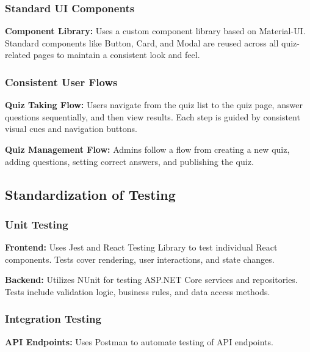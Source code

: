 \subsubsection{Standard UI Components}

  \item \textbf{Component Library:} Uses a custom component library based on Material-UI. Standard components like Button, Card, and Modal are reused across all quiz-related pages to maintain a consistent look and feel.

\subsubsection{Consistent User Flows}

\item \textbf{Quiz Taking Flow:} Users navigate from the quiz list to the quiz page, answer questions sequentially, and then view results. Each step is guided by consistent visual cues and navigation buttons.

\item \textbf{Quiz Management Flow:} Admins follow a flow from creating a new quiz, adding questions, setting correct answers, and publishing the quiz.

\subsection{Standardization of Testing}

\subsubsection{Unit Testing}

\item \textbf{Frontend:} Uses Jest and React Testing Library to test individual React components. Tests cover rendering, user interactions, and state changes.

\item \textbf{Backend:} Utilizes NUnit for testing ASP.NET Core services and repositories. Tests include validation logic, business rules, and data access methods.

\subsubsection{Integration Testing}

\item \textbf{API Endpoints:} Uses Postman to automate testing of API endpoints.


